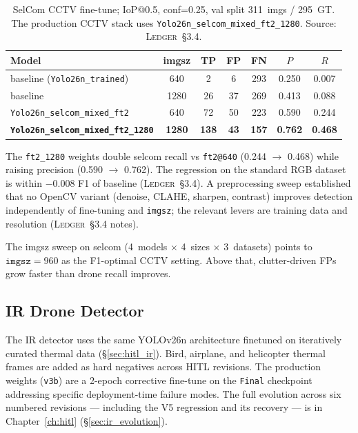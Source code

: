 \begin{table}[htbp]
    \centering
    \caption{SelCom CCTV fine-tune; IoP@0.5, conf=0.25, val split 311~imgs / 295~GT. The production CCTV stack uses \texttt{Yolo26n\_selcom\_mixed\_ft2\_1280}. Source: \textsc{Ledger}~\S3.4.}
    \label{tab:selcom}
    \begin{tabular}{lcccccc}
        \toprule
        Model & imgsz & TP & FP & FN & $P$ & $R$ \\
        \midrule
        baseline (\texttt{Yolo26n\_trained})        & 640  &   2 &  6 & 293 & 0.250 & 0.007 \\
        baseline                                    & 1280 &  26 & 37 & 269 & 0.413 & 0.088 \\
        \texttt{Yolo26n\_selcom\_mixed\_ft2}        & 640  &  72 & 50 & 223 & 0.590 & 0.244 \\
        \textbf{\texttt{Yolo26n\_selcom\_mixed\_ft2\_1280}} & \textbf{1280} & \textbf{138} & \textbf{43} & \textbf{157} & \textbf{0.762} & \textbf{0.468} \\
        \bottomrule
    \end{tabular}
\end{table}

The \texttt{ft2\_1280} weights double selcom recall vs \texttt{ft2@640} (0.244 $\to$ 0.468) while raising precision (0.590 $\to$ 0.762). The regression on the standard RGB dataset is within $-0.008$ F1 of baseline (\textsc{Ledger}~\S3.4). A preprocessing sweep established that no OpenCV variant (denoise, CLAHE, sharpen, contrast) improves detection independently of fine-tuning and \texttt{imgsz}; the relevant levers are training data and resolution (\textsc{Ledger}~\S3.4 notes).

The imgsz sweep on selcom (4~models $\times$ 4~sizes $\times$ 3~datasets) points to $\mathtt{imgsz}=960$ as the F1-optimal CCTV setting. Above that, clutter-driven FPs grow faster than drone recall improves.

\subsection{IR Drone Detector}
\label{sec:ir_detector}

The IR detector uses the same YOLOv26n architecture finetuned on iteratively curated thermal data (\S\ref{sec:hitl_ir}). Bird, airplane, and helicopter thermal frames are added as hard negatives across HITL revisions. The production weights (\texttt{v3b}) are a 2-epoch corrective fine-tune on the \texttt{Final} checkpoint addressing specific deployment-time failure modes. The full evolution across six numbered revisions --- including the V5 regression and its recovery --- is in Chapter~\ref{ch:hitl} (\S\ref{sec:ir_evolution}).

